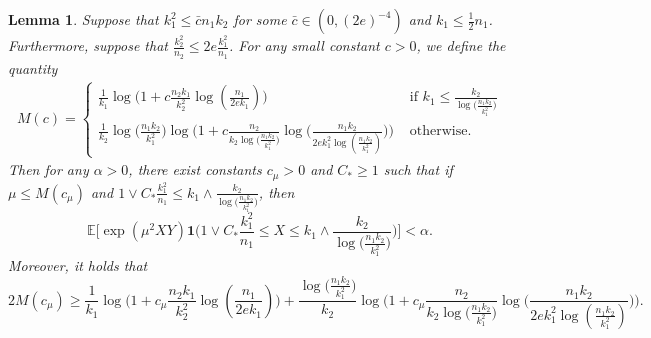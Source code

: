 \documentclass{article}
\newcommand{\EE}{\mathbb{E}}
\newcommand{\one}{\mathbf{1}}
\newcommand{\Ct}{C_{*}}
\newcommand{\ju}[1]{{\color{blue}Julien: #1}}
\newcommand{\pa}[1]{{\color{red}Parker: #1}}
\newtheorem{lemma}{Lemma}
\begin{document}
% 
% 
% 
\begin{lemma}\label{lem_lb_s1d1big_truncchi2}
    Suppose that $k_1^2 \leq \bar{c}n_1k_2$ for some $\bar{c} \in (0,(2e)^{-4})$ and $k_1 \leq \frac12n_1$. Furthermore, suppose that $\frac{k^2_2}{n_2} \leq 2e\frac{k_1^2}{n_1}$. For any small constant $c > 0$, we define the quantity
    \begin{align*}
        M(c) = \begin{cases}
            \frac{1}{k_1}\log\Big(1 + c \frac{n_2k_1}{k_2^2}\log(\frac{n_1}{2ek_1})\Big) & \text{ if } k_1 \leq \frac{k_2}{\log\big(\frac{n_1k_2}{k_1^2}\big)}\\
            \frac{1}{k_2}\log\big(\frac{n_1k_2}{k_1^2}\big)\log\Big(1 + c \frac{n_2}{k_2\log\big(\frac{n_1k_2}{k_1^2}\big)}\log\big(\frac{n_1k_2}{2ek_1^2\log(\frac{n_1k_2}{k_1^2})}\big)\Big) & \text{ otherwise.}
        \end{cases}
    \end{align*}
    Then for any $\alpha > 0$, there exist constants $c_\mu > 0$ and $C_* \geq 1$ such that if $\mu \leq M(c_\mu)$ and $1 \vee \Ct \frac{k_1^2}{n_1}\leq k_1 \wedge\frac{k_2}{\log\big(\frac{n_1k_2}{k_1^2}\big)}$, then 
    \[\EE\Big[\exp(\mu^2XY)\one\Big( 1 \vee \Ct \frac{k_1^2}{n_1} \leq X \leq k_1\wedge\frac{k_2}{\log\big(\frac{n_1k_2}{k_1^2}\big)}\Big)\Big] < \alpha.\]
    Moreover, it holds that    
    $$2M(c_\mu) \geq \frac{1}{k_1}\log\Big(1 + c_\mu \frac{n_2k_1}{k_2^2}\log(\frac{n_1}{2ek_1})\Big) + \frac{\log\big(\frac{n_1k_2}{k_1^2}\big)}{k_2}\log\Big(1 + c_\mu \frac{n_2}{k_2\log\big(\frac{n_1k_2}{k_1^2}\big)}\log\big(\frac{n_1k_2}{2ek_1^2\log(\frac{n_1k_2}{k_1^2})}\big)\Big).$$
\end{lemma}
\end{document}
